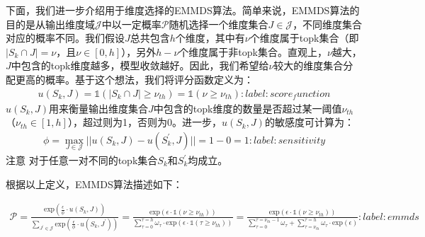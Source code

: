 \documentclass[letterpaper,10pt,english]{sphinxmanual}
\begin{document}
\sphinxAtStartPar
下面，我们进一步介绍用于维度选择的EM\sphinxhyphen{}MDS算法。简单来说，EM\sphinxhyphen{}MDS算法的目的是从输出维度域\(\mathcal{J}\)中以一定概率\(\mathcal{P}\)随机选择一个维度集合\(J\in\mathcal{J}\)，不同维度集合对应的概率不同。我们假设\(J\)总共包含\(h\)个维度，其中有\(\nu\)个维度属于topk集合（即\(|S_k \cap J|=\nu\)，且\(\nu\in[0,h]\)），另外\(h-\nu\)个维度属于非topk集合。直观上，\(\nu\)越大，\(J\)中包含的topk维度越多，模型收敛越好。因此，我们希望给\(\nu\)较大的维度集合分配更高的概率。基于这个想法，我们将评分函数定义为：
\begin{equation}\label{equation:chapter_federated_learning/privacy_encryption_algorithm:chapter_federated_learning/privacy_encryption_algorithm:4}
\begin{split}u(S_{k}, J) = 𝟙(|S_k\cap J| \geq \nu_{th}) =  𝟙(\nu \geq \nu_{th})
:label: score_function\end{split}
\end{equation}
\sphinxAtStartPar
\(u(S_{k}, J)\)用来衡量输出维度集合\(J\)中包含的topk维度的数量是否超过某一阈值\(\nu_{th}\)（\(\nu_{th}\in[1,h]\)），超过则为1，否则为0。进一步，\(u(S_{k}, J)\)的敏感度可计算为：
\begin{equation}\label{equation:chapter_federated_learning/privacy_encryption_algorithm:chapter_federated_learning/privacy_encryption_algorithm:5}
\begin{split}\phi = \max_{J\in\mathcal{J}} ||u(S_{k}, J) - u(S^\prime_{k}, J)||= 1 - 0 = 1
:label: sensitivity\end{split}
\end{equation}
\sphinxAtStartPar
注意
对于任意一对不同的topk集合\(S_k\)和\(S_k^\prime\)均成立。

\sphinxAtStartPar
根据以上定义，EM\sphinxhyphen{}MDS算法描述如下：

\sphinxAtStartPar
{}
\begin{equation}\label{equation:chapter_federated_learning/privacy_encryption_algorithm:chapter_federated_learning/privacy_encryption_algorithm:6}
\begin{split}    \mathcal{P}=\frac{\mathrm{exp}(\frac{\epsilon}{\phi}\cdot u(S_{k}, J))}{\sum_{J^\prime\in\mathcal{J}}\mathrm{exp}(\frac{\epsilon}{\phi}\cdot u(S_{k}, J^\prime))}
    =
    \frac{\mathrm{exp}(\epsilon\cdot 𝟙(\nu \geq \nu_{th}))}{\sum_{\tau=0}^{\tau=h}\omega_{\tau}\cdot \mathrm{exp}(\epsilon\cdot 𝟙(\tau\geq\nu_{th}))}
    =
    \frac{\mathrm{exp}(\epsilon\cdot 𝟙(\nu \geq \nu_{th}))}{\sum_{\tau=0}^{\tau=\nu_{th}-1}\omega_{\tau} + \sum_{\tau=\nu_{th}}^{\tau=h}\omega_{\tau}\cdot \mathrm{exp}(\epsilon)}
:label: emmds\end{split}
\end{equation}
\sphinxAtStartPar
{}
\end{document}
